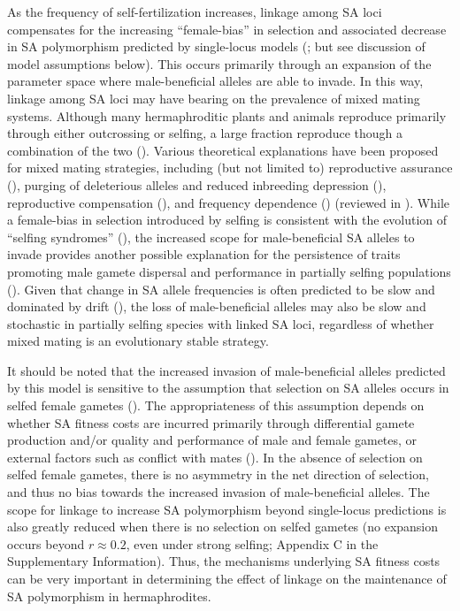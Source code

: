 \documentclass{article}
\begin{document}
As the frequency of self-fertilization increases, linkage among SA loci compensates for the increasing ``female-bias'' in selection and associated decrease in SA polymorphism predicted by single-locus models (\citealt{Charlesworth1978, JordanConn2014}; but see discussion of model assumptions below). This occurs primarily through an expansion of the parameter space where male-beneficial alleles are able to invade. In this way, linkage among SA loci may have bearing on the prevalence of mixed mating systems. Although many hermaphroditic plants and animals reproduce primarily through either outcrossing or selfing, a large fraction reproduce though a combination of the two (\citealt{JarneAuld2006, Goodwillie2005, Igic2005}). Various theoretical explanations have been proposed for mixed mating strategies, including (but not limited to) reproductive assurance (\citealt{Lloyd1979}), purging of deleterious alleles and reduced inbreeding depression (\citealt{LandeSchemske1985}), reproductive compensation (\citealt{HarderRoutley2007, PorcherLande2005}), and frequency dependence (\citealt{Holsinger1991}) (reviewed in \citealt{Goodwillie2005, HarderBarrett2006}). While a female-bias in selection introduced by selfing is consistent with the evolution of ``selfing syndromes'' (\citealt{Sicard2011}), the increased scope for male-beneficial SA alleles to invade provides another possible explanation for the persistence of traits promoting male gamete dispersal and performance in partially selfing populations (\citealt{Barrett2002, Goodwillie2005, HarderBarrett2006}). Given that change in SA allele frequencies is often predicted to be slow and dominated by drift (\citealt{ConnClark2011, ConnClark2012, ConnClark2014}), the loss of male-beneficial alleles may also be slow and stochastic in partially selfing species with linked SA loci, regardless of whether mixed mating is an evolutionary stable strategy.

It should be noted that the increased invasion of male-beneficial alleles predicted by this model is sensitive to the assumption that selection on SA alleles occurs in selfed female gametes (\citealt{Tazzyman2015}). The appropriateness of this assumption depends on whether SA fitness costs are incurred primarily through differential gamete production and/or quality and performance of male and female gametes, or external factors such as conflict with mates (\citealt{Tazzyman2015}). In the absence of selection on selfed female gametes, there is no asymmetry in the net direction of selection, and thus no bias towards the increased invasion of male-beneficial alleles. The scope for linkage to increase SA polymorphism beyond single-locus predictions is also greatly reduced when there is no selection on selfed gametes (no expansion occurs beyond $r \approx 0.2$, even under strong selfing; Appendix C in the Supplementary Information). Thus, the mechanisms underlying SA fitness costs can be very important in determining the effect of linkage on the maintenance of SA polymorphism in hermaphrodites.
\end{document}
